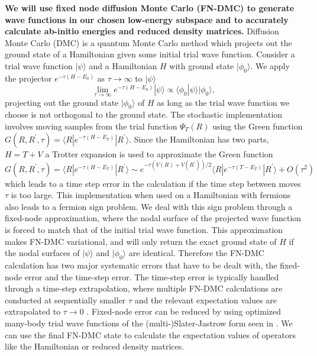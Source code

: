 \documentclass{article}
\begin{document}
\textbf{We will use fixed node diffusion Monte Carlo (FN-DMC) to generate
wave functions in our chosen low-energy subspace and to accurately calculate ab-initio energies and reduced density matrices. }
Diffusion Monte Carlo (DMC) is a quantum Monte Carlo method which projects out the ground state of a Hamiltonian given some initial trial wave function. 
Consider a trial wave function $|\psi\rangle$ and a Hamiltonian $H$ with ground state $|\phi_0\rangle$. 
We apply the projector $e^{-\tau (H-E_0)}$ as $\tau \rightarrow \infty$ to $|\psi \rangle$
\begin{equation}
\lim_{\tau \rightarrow \infty} e^{-\tau (H-E_0)} |\psi\rangle \propto \langle \phi_0|\psi\rangle |\phi_0\rangle,
\end{equation}
projecting out the ground state $|\phi_0\rangle$ of $H$ as long as the trial wave function we choose is not orthogonal to the ground state. 
The stochastic implementation involves moving samples from the trial function $\Psi_T(R)$ using the Green function $G(R, R^\prime, \tau) = \langle R | e^{-\tau(H - E_T)} | R^\prime \rangle$. 
Since the Hamiltonian has two parts, $H = T + V$ a Trotter expansion is used to approximate the Green function $G(R, R^\prime, \tau) = \langle R | e^{-\tau(H - E_T)} | R^\prime \rangle \sim e^{-\tau(V(R) + V(R^\prime))/2} \langle R| e^{-\tau(T - E_T)}|R^\prime \rangle + O(\tau^2) $ which leads to a time step error in the calculation if the time step between moves $\tau$ is too large. 
This implementation when used on a Hamiltonian with fermions also leads to a fermion sign problem. 
We deal with this sign problem through a fixed-node approximation, where the nodal surface of the projected wave function is forced to match that of the initial trial wave function. 
This approximation makes FN-DMC variational, and will only return the exact ground state of $H$ if the nodal surfaces of $|\psi\rangle$ and $|\phi_0\rangle$ are identical. 
Therefore the FN-DMC calculation has two major systematic errors that have to be dealt with, the fixed-node error and the time-step error. 
The time-step error is typically handled through a time-step extrapolation, where multiple FN-DMC calculations are conducted at sequentially smaller $\tau$ and the relevant expectation values are extrapolated to $\tau \rightarrow 0$ \cite{Needs2010}. 
Fixed-node error can be reduced by using optimized many-body trial wave functions of the (multi-)Slater-Jastrow form seen in \cite{PhysRevLett.98.110201}.
We can use the final FN-DMC state to calculate the expectation values of operators like the Hamiltonian or reduced density matrices.
\end{document}
